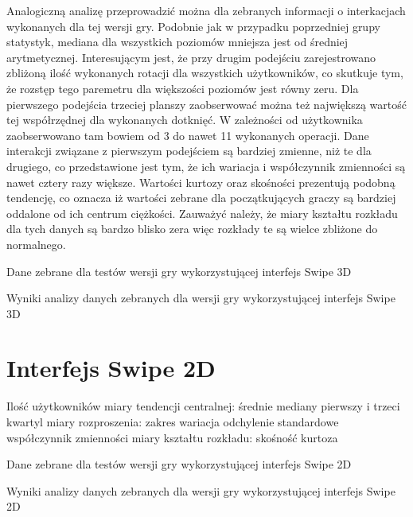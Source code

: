 \documentclass[a4paper,12pt,numbers=noenddot]{report}
\begin{document}
Analogiczną analizę przeprowadzić można dla zebranych informacji o interkacjach wykonanych dla tej wersji gry. Podobnie jak w przypadku poprzedniej grupy statystyk, mediana dla wszystkich poziomów mniejsza jest od średniej arytmetycznej. Interesującym jest, że przy drugim podejściu zarejestrowano zbliżoną ilość wykonanych rotacji dla wszystkich użytkowników, co skutkuje tym, że rozstęp tego paremetru dla większości poziomów jest równy zeru. Dla pierwszego podejścia trzeciej planszy zaobserwować można też największą wartość tej współrzędnej dla wykonanych dotknięć. W zależności od użytkownika zaobserwowano tam bowiem od 3 do nawet 11 wykonanych operacji.
Dane interakcji związane z pierwszym podejściem są bardziej zmienne, niż te dla drugiego, co przedstawione jest tym, że ich wariacja i współczynnik zmienności są nawet cztery razy większe. Wartości kurtozy oraz skośności prezentują podobną tendencję, co oznacza iż wartości zebrane dla początkujących graczy są bardziej oddalone od ich centrum ciężkości. Zauważyć należy, że miary kształtu rozkładu dla tych danych są bardzo blisko zera więc rozkłady te są wielce zbliżone do normalnego.
\begin{table}

  \caption{Dane zebrane dla testów wersji gry wykorzystującej interfejs Swipe 3D}
  \resizebox{\textwidth}{!}{%
	
  \end{tabular}%
  }
  \label{tab:results_Swipe3d}%
  \caption{Wyniki analizy danych zebranych dla wersji gry wykorzystującej interfejs Swipe 3D}
  \resizebox{\textwidth}{!}{%
	
  \end{tabular}%
  }
  \label{tab:analysis_Swipe3d}%
\end{table}%


\section{Interfejs Swipe 2D}%
Ilość użytkowników
miary tendencji centralnej:
	średnie
	mediany
	pierwszy i trzeci kwartyl
miary rozproszenia:
	zakres
	wariacja
	odchylenie standardowe
	współczynnik zmienności
miary kształtu rozkładu:
	skośność
	kurtoza

\begin{table}
  \caption{Dane zebrane dla testów wersji gry wykorzystującej interfejs Swipe 2D}
  \resizebox{0.9\textwidth}{!}{%
	
  }
  \label{tab:results_Swipe2d}%
  
  
  \caption{Wyniki analizy danych zebranych dla wersji gry wykorzystującej interfejs Swipe 2D}
  \resizebox{0.9\textwidth}{!}{%
	
  }
  \label{tab:analysis_Swipe2d}%
\end{table}%
\end{document}
